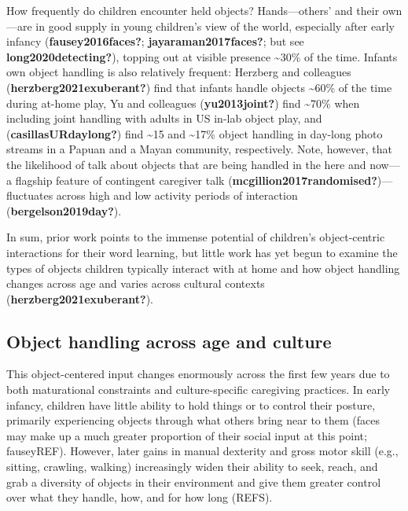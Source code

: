 \documentclass[10pt, letterpaper]{article}
\begin{document}
How frequently do children encounter held objects? Hands---others' and
their own---are in good supply in young children's view of the world,
especially after early infancy (\textbf{fausey2016faces?};
\textbf{jayaraman2017faces?}; but see \textbf{long2020detecting?}),
topping out at visible presence \textasciitilde30\% of the time. Infants
own object handling is also relatively frequent: Herzberg and colleagues
(\textbf{herzberg2021exuberant?}) find that infants handle objects
\textasciitilde60\% of the time during at-home play, Yu and colleagues
(\textbf{yu2013joint?}) find \textasciitilde70\% when including joint
handling with adults in US in-lab object play, and
(\textbf{casillasURdaylong?}) find \textasciitilde15 and
\textasciitilde17\% object handling in day-long photo streams in a
Papuan and a Mayan community, respectively. Note, however, that the
likelihood of talk about objects that are being handled in the here and
now---a flagship feature of contingent caregiver talk
(\textbf{mcgillion2017randomised?})---fluctuates across high and low
activity periods of interaction (\textbf{bergelson2019day?}).

In sum, prior work points to the immense potential of children's
object-centric interactions for their word learning, but little work has
yet begun to examine the types of objects children typically interact
with at home and how object handling changes across age and varies
across cultural contexts (\textbf{herzberg2021exuberant?}).

\hypertarget{object-handling-across-age-and-culture}{%
\subsection{Object handling across age and
culture}\label{object-handling-across-age-and-culture}}

This object-centered input changes enormously across the first few years
due to both maturational constraints and culture-specific caregiving
practices. In early infancy, children have little ability to hold things
or to control their posture, primarily experiencing objects through what
others bring near to them (faces may make up a much greater proportion
of their social input at this point; fauseyREF). However, later gains in
manual dexterity and gross motor skill (e.g., sitting, crawling,
walking) increasingly widen their ability to seek, reach, and grab a
diversity of objects in their environment and give them greater control
over what they handle, how, and for how long (REFS).
\end{document}
